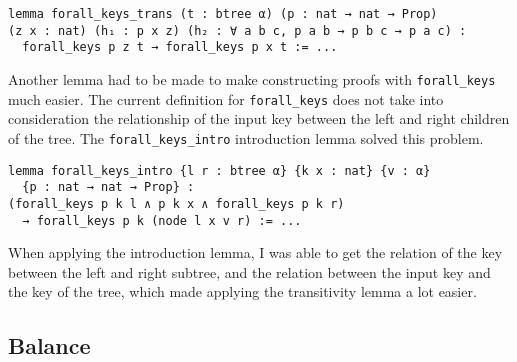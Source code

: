 \begin{lstlisting}[caption=\empty]
lemma forall_keys_trans (t : btree α) (p : nat → nat → Prop) 
(z x : nat) (h₁ : p x z) (h₂ : ∀ a b c, p a b → p b c → p a c) :
  forall_keys p z t → forall_keys p x t := ...
\end{lstlisting}

Another lemma had to be made to make constructing proofs with \lstinline{forall_keys} much easier. The current definition for \lstinline{forall_keys} does not take into consideration the relationship of the input key between the left and right children of the tree. The \lstinline{forall_keys_intro} introduction lemma solved this problem.

\begin{lstlisting}[caption=\empty]
lemma forall_keys_intro {l r : btree α} {k x : nat} {v : α} 
  {p : nat → nat → Prop} :
(forall_keys p k l ∧ p k x ∧ forall_keys p k r) 
  → forall_keys p k (node l x v r) := ...
\end{lstlisting}

When applying the introduction lemma, I was able to get the relation of the key between the left and right subtree, and the relation between the input key and the key of the tree, which made applying the transitivity lemma a lot easier.

\subsection*{Balance}